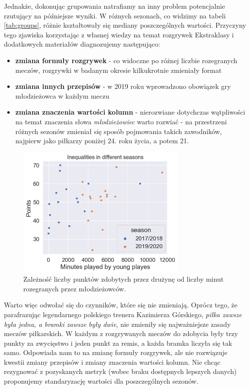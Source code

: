 \documentclass{article}
\begin{document}
Jednakże, dokonując grupowania natrafiamy na inny problem potencjalnie rzutujący na późniejsze wyniki. W różnych sezonach, co widzimy na tabeli \ref{tab:groups}, różnie kształtowały się mediany poszczególnych wartości. Przyczyny tego zjawiska korzystając z własnej wiedzy na temat rozgrywek Ekstraklasy i dodatkowych materiałów \cite{przepis} diagnozujemy następująco:
\begin{itemize}
    \item \textbf{zmiana formuły rozgrywek} - co widoczne po różnej liczbie rozegranych meczów, rozgrywki w badanym okresie kilkukrotnie zmieniały format
    \item \textbf{zmiana innych przepisów} - w 2019 roku wprowadzono obowiązek gry młodzieżowca w każdym meczu
    \item \textbf{zmiana znaczenia wartości kolumn} - nierozwiane dotychczas wątpliwości na temat znaczenia słowa \textit{młodzieżowiec} warto rozwiać - na przestrzeni różnych sezonów zmieniał się sposób pojmowania takich zawodników, najpierw jako piłkarzy poniżej 24. roku życia, a potem 21.
\end{itemize}

\begin{figure}[h!]
    \centering
    \includegraphics[width=0.75\textwidth]{min_by_sea.png}
    \caption{Zależność liczby punktów zdobytych przez drużynę od liczby minut rozegranych przez młodzieżowców.}
    \label{fig:min_by_sea}
\end{figure}

Warto więc odwołać się do czynników, które się nie zmieniają. Oprócz tego, że parafrazując legendarnego polskiego trenera Kazimierza Górskiego, \textit{piłka zawsze była jedna, a bramki zawsze były dwie}, nie zmieniły się najważniejsze zasady meczów piłkarskich. W każdym z rozgrywanych meczów do zdobycia były trzy punkty za zwycięstwo i jeden punkt za remis, a każda bramka liczyła się tak samo. Odpowiada nam to na zmianę formuły rozgrywek, ale nie rozwiązuje kwestii zmiany przepisów i zmiany znaczenia wartości kolumn. Nie chcąc rezygnować z pozyskanych metryk (wobec braku dostępnych lepszych danych) proponujemy standaryzację wartości dla poszczególnych sezonów.
\end{document}
